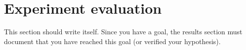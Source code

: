 \chapter{Experiment evaluation}

This section should write itself. Since you have a goal, the results section must document that you have reached this goal (or verified your hypothesis).

